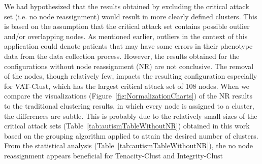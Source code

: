 \documentclass{bmcart}
\begin{document}
We had hypothesized that the results obtained by excluding the critical attack set (i.e. no node reassignment) would result in more clearly defined clusters. This is based on the assumption that the critical attack set contains possible outlier and/or overlapping nodes. As mentioned earlier, outliers in the context of this application could denote patients that may have some errors in their phenotype data from the data collection process. However, the results obtained for the configurations without node reassignment (NR) are not conclusive. The removal of the nodes, though relatively few, impacts the resulting configuration especially for VAT-Clust, which has the largest critical attack set of 108 nodes. 
When we compare the visualizations (Figure~\ref{fig:NormalizationCharts}) of the NR results to the traditional clustering results, in which every node is assigned to a cluster, the differences are subtle. This is probably due to the relatively small sizes of the critical attack sets (Table~\ref{tab:autismTableWithoutNR}) obtained in this work based on the grouping algorithm applied to attain the desired number of clusters.
From the statistical analysis (Table~\ref{tab:autismTableWithoutNR}), the no node reassignment appears beneficial for Tenacity-Clust and Integrity-Clust 


\end{document}
